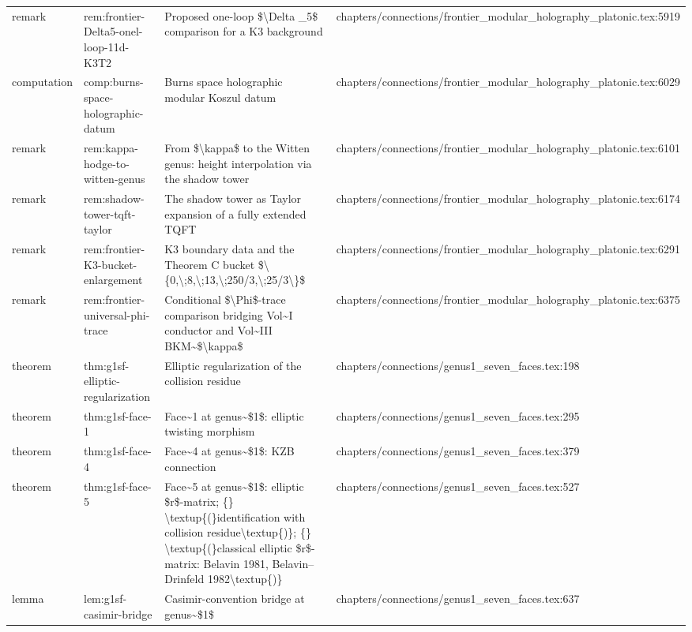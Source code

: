 \documentclass[11pt]{article}
\begin{document}
\begin{longtable}{L{0.10\textwidth}L{0.26\textwidth}L{0.42\textwidth}L{0.22\textwidth}}
remark & rem:frontier-Delta5-onel-loop-11d-K3T2 & Proposed one-loop \$\textbackslash{}Delta \_5\$ comparison for a K3 background & chapters/connections/frontier\_modular\_holography\_platonic.tex:5919\\
computation & comp:burns-space-holographic-datum & Burns space holographic modular Koszul datum & chapters/connections/frontier\_modular\_holography\_platonic.tex:6029\\
remark & rem:kappa-hodge-to-witten-genus & From \$\textbackslash{}kappa\$ to the Witten genus: height interpolation via the shadow tower & chapters/connections/frontier\_modular\_holography\_platonic.tex:6101\\
remark & rem:shadow-tower-tqft-taylor & The shadow tower as Taylor expansion of a fully extended TQFT & chapters/connections/frontier\_modular\_holography\_platonic.tex:6174\\
remark & rem:frontier-K3-bucket-enlargement & K3 boundary data and the Theorem C bucket \$\textbackslash{}\{0,\textbackslash{};8,\textbackslash{};13,\textbackslash{};250/3,\textbackslash{};25/3\textbackslash{}\}\$ & chapters/connections/frontier\_modular\_holography\_platonic.tex:6291\\
remark & rem:frontier-universal-phi-trace & Cond{}itional \$\textbackslash{}Phi\$-trace comparison bridging Vol\textasciitilde{}I conductor and Vol\textasciitilde{}III BKM\textasciitilde{}\$\textbackslash{}kappa\$ & chapters/connections/frontier\_modular\_holography\_platonic.tex:6375\\
theorem & thm:g1sf-elliptic-regularization & Elliptic regularization of the collision residue & chapters/connections/genus1\_seven\_faces.tex:198\\
theorem & thm:g1sf-face-1 & Face\textasciitilde{}1 at genus\textasciitilde{}\$1\$: elliptic twisting morphism & chapters/connections/genus1\_seven\_faces.tex:295\\
theorem & thm:g1sf-face-4 & Face\textasciitilde{}4 at genus\textasciitilde{}\$1\$: KZB connection & chapters/connections/genus1\_seven\_faces.tex:379\\
theorem & thm:g1sf-face-5 & Face\textasciitilde{}5 at genus\textasciitilde{}\$1\$: elliptic \$r\$-matrix; \{\} \textbackslash{}textup\{(\}identification with collision residue\textbackslash{}textup\{)\}; \{\} \textbackslash{}textup\{(\}classical elliptic \$r\$-matrix: Belavin 1981, Belavin--Drinfeld 1982\textbackslash{}textup\{)\} & chapters/connections/genus1\_seven\_faces.tex:527\\
lemma & lem:g1sf-casimir-bridge & Casimir-convention bridge at genus\textasciitilde{}\$1\$ & chapters/connections/genus1\_seven\_faces.tex:637\\

\end{longtable}
\end{document}
